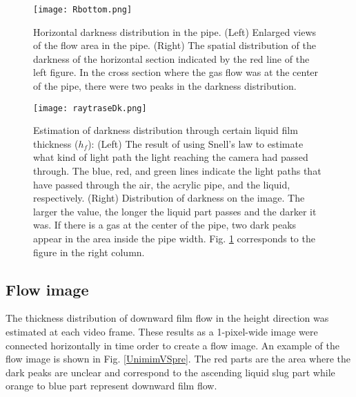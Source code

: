 \documentclass[aps,pre,preprint,groupedaddress,showkeys]{revtex4-2}
\begin{document}
\begin{figure}
\texttt{[image: Rbottom.png]} 
\caption{\label{Rbottom} Horizontal darkness distribution in the pipe.
(Left) Enlarged views of the flow area in the pipe.
(Right) The spatial distribution of the darkness of the horizontal section indicated by the red line of the left figure.
In the cross section where the gas flow was at the center of the pipe, there were two peaks in the darkness distribution.}
\end{figure}

\begin{figure}
\texttt{[image: raytraseDk.png]} 
\caption{\label{raytraseDk}Estimation of darkness distribution through certain liquid film thickness ($ h_f $):
(Left) The result of using Snell's law to estimate what kind of light path the light reaching the camera had passed through.
The blue, red, and green lines indicate the light paths that have passed through the air, the acrylic pipe, and the liquid, respectively.
(Right) Distribution of darkness on the image.
The larger the value, the longer the liquid part passes and the darker it was.
If there is a gas at the center of the pipe, two dark peaks appear in the area inside the pipe width.
Fig. \ref{Rbottom} corresponds to the figure in the right column.}
\end{figure}

\subsection{Flow image}\label{flowim}
The thickness distribution of downward film flow in the height direction was estimated at each video frame.
These results as a 1-pixel-wide image were connected horizontally in time order to create a flow image.
An example of the flow image is shown in Fig. \ref{UnimimVSpre}. 
The red parts are the area where the dark peaks are unclear and correspond to the ascending liquid slug part while orange to blue part represent downward film flow.
\end{document}
